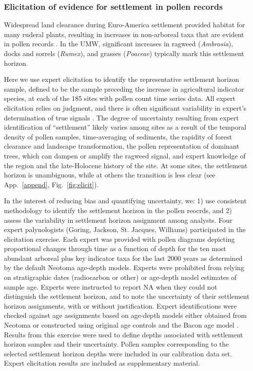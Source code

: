 \documentclass[12pt]{article}
\begin{document}
\subsubsection{Elicitation of evidence for settlement in pollen
  records}

Widespread land clearance during Euro-America settlement provided
habitat for many ruderal plants, resulting in increases in
non-arboreal taxa that are evident in pollen records
\citep{mcandrews1988human}. In the UMW, significant
increases in ragweed (\textit{Ambrosia}), docks and sorrels
(\textit{Rumex}), and grasses (\textit{Poaceae}) typically mark this
settlement horizon.

Here we use expert elicitation to identify the representative
settlement horizon sample, defined to be the sample preceding the
increase in agricultural indicator species, at each of the 185 sites
with pollen count time series data. All expert elicitation relies on
judgment, and there is often significant variability in expert's
determination of true signals \citep{bond2007you, bond2012makes}. The
degree of uncertainty resulting from expert identification of
``settlement'' likely varies among sites as a result of the temporal
density of pollen samples, time-averaging of sediments, the rapidity
of forest clearance and landscape transformation, the pollen
representation of dominant trees, which can dampen or amplify the
ragweed signal, and expert knowledge of the region and the
late-Holocene history of the site. At some sites, the settlement
horizon is unambiguous, while at others the transition is less clear
(see App.~\ref{append}, Fig.~\ref{fig:elicit}).

In the interest of reducing bias and quantifying uncertainty, we: 1)
use consistent methodology to identify the settlement horizon in the
pollen reocrds, and 2) assess the variability in settlement horizon
assignment among analysts. Four expert palynologists (Goring, Jackson,
St. Jacques, Williams) participated in the elicitation exercise. Each
expert was provided with pollen diagrams depicting proportional
changes through time as a function of depth for the ten most abundant
arboreal plus key indicator taxa for the last 2000 years as determined
by the default Neotoma age-depth models. Experts were prohibited from
relying on stratigraphic dates (radiocarbon or other) or age-depth
model estimates of sample age. Experts were instructed to report NA
when they could not distinguish the settlement horizon, and to note
the uncertainty of their settlement horizon assignments, with or
without justification. Expert identifications were checked against age
assignments based on age-depth models either obtained from Neotoma or
constructed using original age controls and the Bacon age model
\citep{blaauw2011flexible}.  Results from this exercise were used to
define depths associated with settlement horizon samples and their
uncertainty. Pollen samples corresponding to the selected settlement
horizon depths were included in our calibration data set. Expert
elicitation results are included as supplementary material.
\end{document}
